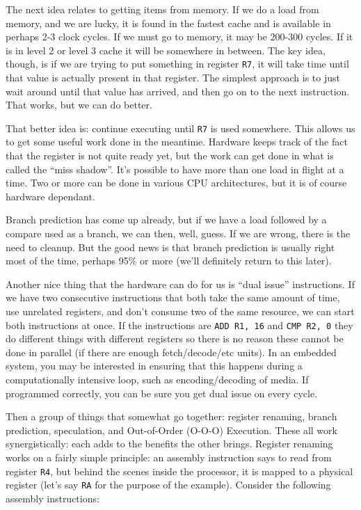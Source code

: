 \documentclass[a4paper]{report}
\begin{document}
The next idea relates to getting items from memory. If we do a load from memory, and we are lucky, it is found in the fastest cache and is available in perhaps 2-3 clock cycles. If we must go to memory, it may be 200-300 cycles. If it is in level 2 or level 3 cache it will be somewhere in between. The key idea, though, is if we are trying to put something in register \texttt{R7}, it will take time until that value is actually present in that register. The simplest approach is to just wait around until that value has arrived, and then go on to the next instruction. That works, but we can do better.

That better idea is: continue executing until \texttt{R7} is used somewhere. This allows us to get some useful work done in the meantime. Hardware keeps track of the fact that the register is not quite ready yet, but the work can get done in what is called the ``miss shadow''. It's possible to have more than one load in flight at a time. Two or more can be done in various CPU architectures, but it is of course hardware dependant. 

Branch prediction has come up already, but if we have a load followed by a compare used as a branch, we can then, well, guess. If we are wrong, there is the need to cleanup. But the good news is that branch prediction is usually right most of the time, perhaps 95\% or more (we'll definitely return to this later).

Another nice thing that the hardware can do for us is ``dual issue'' instructions. If we have two consecutive instructions that both take the same amount of time, use unrelated registers, and don't consume two of the same resource, we can start both instructions at once. If the instructions are \texttt{ADD R1, 16} and \texttt{CMP R2, 0} they do different things with different registers so there is no reason these cannot be done in parallel (if there are enough fetch/decode/etc units). In an embedded system, you may be interested in ensuring that this happens during a computationally intensive loop, such as encoding/decoding of media. If programmed correctly, you can be sure you get dual issue on every cycle.

Then a group of things that somewhat go together: register renaming, branch prediction, speculation, and Out-of-Order (O-O-O) Execution. These all work synergistically: each adds to the benefits the other brings. Register renaming works on a fairly simple principle: an assembly instruction says to read from register \texttt{R4}, but behind the scenes inside the processor, it is mapped to a physical register (let's say \texttt{RA} for the purpose of the example). Consider the following assembly instructions:
\end{document}
